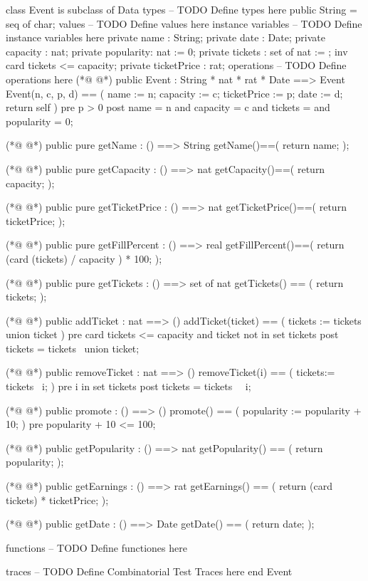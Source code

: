 \begin{vdmpp}[breaklines=true]
class Event is subclass of Data
types
-- TODO Define types here
  public String = seq of char;
values
-- TODO Define values here
instance variables
-- TODO Define instance variables here
 private name : String;
 private date : Date;
 private capacity : nat;
 private popularity: nat := 0;
 private tickets : set of nat := {};
  inv card tickets <= capacity;
 private ticketPrice : rat;
operations
-- TODO Define operations here
(*@
\label{Event:18}
@*)
 public Event : String * nat * rat * Date ==> Event
 Event(n, c, p, d) == (
  name := n; 
  capacity := c; 
  ticketPrice := p;
  date := d; 
  return self
 )
 pre p > 0
 post name = n and capacity = c and tickets = {} and popularity = 0;
    
(*@
\label{getName:29}
@*)
 public pure getName : () ==> String
 getName()==(
  return name;
 );
 
(*@
\label{getCapacity:34}
@*)
 public pure getCapacity : () ==> nat
 getCapacity()==(
  return capacity;
 );
 
(*@
\label{getTicketPrice:39}
@*)
 public pure getTicketPrice : () ==> nat
 getTicketPrice()==(
  return ticketPrice;
 );
 
(*@
\label{getFillPercent:44}
@*)
 public pure getFillPercent : () ==> real
 getFillPercent()==(
  return (card (tickets) / capacity ) * 100;
 );
 
(*@
\label{getTickets:49}
@*)
 public pure getTickets : () ==> set of nat
 getTickets() == (
  return tickets;
 );
 
(*@
\label{addTicket:54}
@*)
 public addTicket : nat ==> ()
 addTicket(ticket) == (
  tickets := tickets union {ticket}
 )
 pre card tickets <= capacity and ticket not in set tickets
 post tickets = tickets~ union {ticket};
 
(*@
\label{removeTicket:61}
@*)
 public removeTicket : nat ==> ()
 removeTicket(i) == (
  tickets:= tickets \ {i}; 
 )
 pre i in set tickets
 post tickets = tickets~ \ {i}; 
 
(*@
\label{promote:68}
@*)
 public promote : () ==> ()
 promote() == (
  popularity := popularity + 10;
 )
 pre popularity + 10 <= 100;
 
(*@
\label{getPopularity:74}
@*)
 public getPopularity : () ==> nat
 getPopularity() == (
  return popularity;
 );
 
(*@
\label{getEarnings:79}
@*)
 public getEarnings : () ==> rat
 getEarnings() == (
  return (card tickets) * ticketPrice; 
 );
 
(*@
\label{getDate:84}
@*)
 public getDate : () ==> Date
 getDate() == (
  return date;
 );
 
functions
-- TODO Define functiones here
  
traces
-- TODO Define Combinatorial Test Traces here
end Event
\end{vdmpp}
